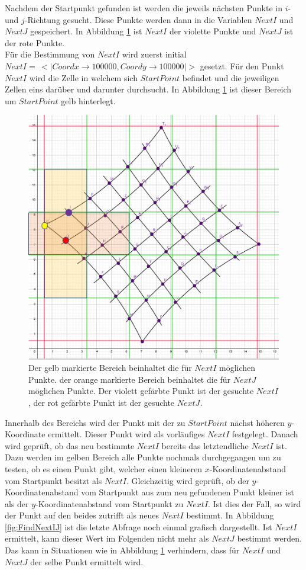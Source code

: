 Nachdem der Startpunkt gefunden ist werden die jeweils nächsten Punkte in $i$- und $j$-Richtung gesucht. Diese Punkte werden dann in die Variablen $NextI$ und $NextJ$ gespeichert. In Abbildung \ref{fig:NextINextJ} ist $NextI$ der violette Punkte und $NextJ$ ist der rote Punkte. \\

Für die Bestimmung von $NextI$ wird zuerst initial $NextI = \, <|Coordx \rightarrow 100 000, Coordy \rightarrow 100 000|>$ gesetzt. Für den Punkt $NextI$ wird die Zelle in welchem sich $StartPoint$ befindet und die jeweiligen Zellen eins darüber und darunter durchsucht. In Abbildung \ref{fig:NextINextJ} ist dieser Bereich um $StartPoint$ gelb hinterlegt. 



\begin{figure}[!htb]
	\centering
	\includegraphics[width=0.6\linewidth]{images/VerzeichnetesSchachbrett_2.png}
	\caption[Bestimmung von Startvektoren]{Der gelb markierte Bereich beinhaltet die für $NextI$ möglichen Punkte. der orange markierte Bereich beinhaltet die für $NextJ$ möglichen Punkte. Der violett gefärbte Punkt ist der gesuchte $NextI$, der rot gefärbte Punkt ist der gesuchte $NextJ$.}
	\label{fig:NextINextJ}
\end{figure}


Innerhalb des Bereichs wird der Punkt mit der zu $StartPoint$ nächst höheren $y$-Koordinate ermittelt. Dieser Punkt wird als vorläufiges $NextI$ festgelegt. Danach wird geprüft, ob das neu bestimmte $NextI$ bereits das letztendliche $NextI$ ist. Dazu werden im gelben Bereich alle Punkte nochmals durchgegangen um zu testen, ob es einen Punkt gibt, welcher einen kleineren $x$-Koordinatenabstand vom Startpunkt besitzt als $NextI$. Gleichzeitig wird geprüft, ob der $y$-Koordinatenabstand vom Startpunkt aus zum neu gefundenen Punkt kleiner ist als der $y$-Koordinatenabstand vom Startpunkt zu $NextI$.  Ist dies der Fall, so wird der Punkt auf den beides zutrifft als neues $NextI$ bestimmt. In Abbildung \ref{fig:FindNextIJ} ist die letzte Abfrage noch einmal grafisch dargestellt. Ist $NextI$ ermittelt, kann dieser Wert im Folgenden nicht mehr als $NextJ$ bestimmt werden. Das kann in Situationen wie in Abbildung \ref{fig:NextINextJ} verhindern, dass für $NextI$ und $NextJ$ der selbe Punkt ermittelt wird.\\

